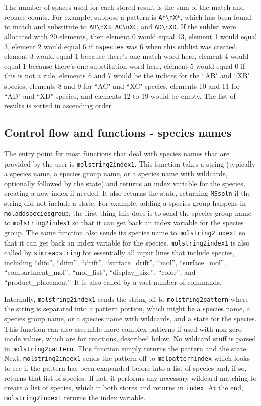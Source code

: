 \documentclass {scrbook}
\newcommand {\ttt} {\texttt}
\begin{document}
The number of spaces used for each stored result is the sum of the match and replace counts. For example, suppose a pattern is \ttt{A*\textbackslash nX*}, which has been found to match and substitute to \ttt{AB\textbackslash nXB}, \ttt{AC\textbackslash nXC}, and \ttt{AD\textbackslash nXD}. If the sublist were allocated with 20 elements, then element 0 would equal 13, element 1 would equal 3, element 2 would equal 6 if \ttt{nspecies} was 6 when this sublist was created, element 3 would equal 1 because there's one match word here, element 4 would equal 1 because there's one substitution word here, element 5 would equal 0 if this is not a rule, elements 6 and 7 would be the indices for the ``AB" and ``XB" species, elements 8 and 9 for ``AC" and ``XC" species, elements 10 and 11 for ``AD" and ``XD" species, and elements 12 to 19 would be empty. The list of results is sorted in ascending order.

\subsection{Control flow and functions - species names}

The entry point for most functions that deal with species names that are provided by the user is \ttt{molstring2index1}. This function takes a string (typically a species name, a species group name, or a species name with wildcards, optionally followed by the state) and returns an index variable for the species, creating a new index if needed. It also returns the state, returning \ttt{MSsoln} if the string did not include a state. For example, adding a species group happens in \ttt{moladdspeciesgroup}; the first thing this does is to send the species group name to \ttt{molstring2index1} so that it can get back an index variable for the species group. The same function also sends its species name to \ttt{molstring2index1} so that it can get back an index variable for the species. \ttt{molstring2index1} is also called by \ttt{simreadstring} for essentially all input lines that include species, including ``difc'', ``difm'', ``drift'', ``surface\_drift'', ``mol'', ``surface\_mol'', ``compartment\_mol'', ``mol\_list'', ``display\_size'', ``color'', and ``product\_placement''. It is also called by a vast number of commands.

Internally, \ttt{molstring2index1} sends the string off to \ttt{molstring2pattern} where the string is separated into a pattern portion, which might be a species name, a species group name, or a species name with wildcards, and a state for the species. This function can also assemble more complex patterns if used with non-zero mode values, which are for reactions, described below. No wildcard stuff is parsed in \ttt{molstring2pattern}. This function simply returns the pattern and the state. Next, \ttt{molstring2index1} sends the pattern off to \ttt{molpatternindex} which looks to see if the pattern has been exapanded before into a list of species and, if so, returns that list of species. If not, it performs any necessary wildcard matching to create a list of species, which it both stores and returns in \ttt{index}. At the end, \ttt{molstring2index1} returns the index variable.
\end{document}
